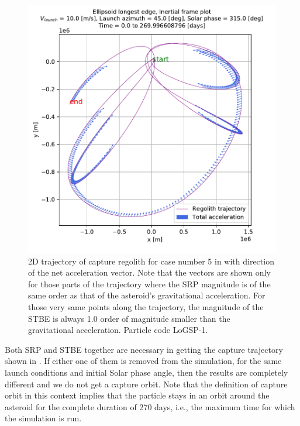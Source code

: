 \FloatBarrier
\begin{figure}[htb]
\centering
\captionsetup{justification=centering}
\includegraphics[width=\linewidth, height=0.4\textheight, keepaspectratio=true]{longest_edge_perturbations/3.2Density_1cmSize/10ms_45Azimuth_315SolarPhase/totalAcceleration.pdf}
\caption{2D trajectory of capture regolith for case number 5 in  with direction of the net acceleration vector. Note that the vectors are shown only for those parts of the trajectory where the \gls{SRP} magnitude is of the same order as that of the asteroid's gravitational acceleration. For those very same points along the trajectory, the magnitude of the \gls{STBE} is always 1.0 order of magnitude smaller than the gravitational acceleration. Particle code LoGSP-1.}
\label{fig:LoGSP_1_capture_case_5_2d_totalAccelerationVector_inertialFrame}
\end{figure}
\FloatBarrier
Both \gls{SRP} and \gls{STBE} together are necessary in getting the capture trajectory shown in . If either one of them is removed from the simulation, for the same launch conditions and initial Solar phase angle, then the results are completely different and we do not get a capture orbit. Note that the definition of capture orbit in this context implies that the particle stays in an orbit around the asteroid for the complete duration of 270 days, i.e., the maximum time for which the simulation is run.

